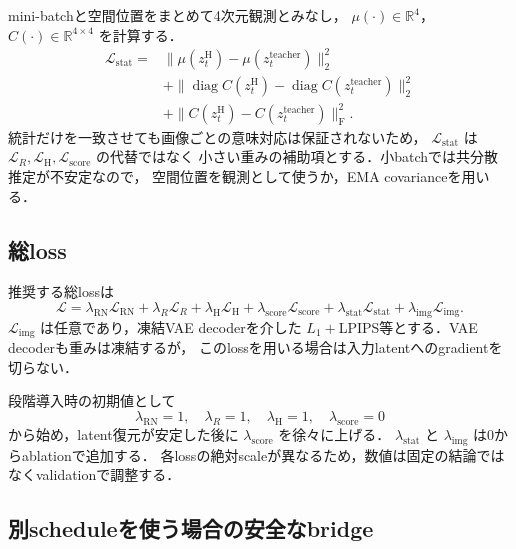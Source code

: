 \documentclass[11pt,a4paper]{ltjsarticle}
\newcommand{\R}{\mathbb{R}}
\begin{document}
mini-batchと空間位置をまとめて4次元観測とみなし，
\(\mu(\cdot)\in\R^4\)，\(C(\cdot)\in\R^{4\times4}\) を計算する．
\begin{equation}
\begin{split}
  \mathcal L_{\mathrm{stat}}
  ={}&
  \lVert\mu(z_t^{\mathrm H})-\mu(z_t^{\mathrm{teacher}})\rVert_2^2\\
  &+
  \lVert
    \operatorname{diag}C(z_t^{\mathrm H})
    -
    \operatorname{diag}C(z_t^{\mathrm{teacher}})
  \rVert_2^2\\
  &+
  \lVert
    C(z_t^{\mathrm H})-C(z_t^{\mathrm{teacher}})
  \rVert_{\mathrm F}^2 .
\end{split}
\label{eq:stat-loss}
\end{equation}
統計だけを一致させても画像ごとの意味対応は保証されないため，
\(\mathcal L_{\mathrm{stat}}\) は
\(\mathcal L_R,\mathcal L_{\mathrm H},\mathcal L_{\mathrm{score}}\) の代替ではなく
小さい重みの補助項とする．小batchでは共分散推定が不安定なので，
空間位置を観測として使うか，EMA covarianceを用いる．

\subsection{総loss}

推奨する総lossは
\begin{equation}
  \mathcal L
  =
  \lambda_{\mathrm{RN}}\mathcal L_{\mathrm{RN}}
  +
  \lambda_R\mathcal L_R
  +
  \lambda_{\mathrm H}\mathcal L_{\mathrm H}
  +
  \lambda_{\mathrm{score}}\mathcal L_{\mathrm{score}}
  +
  \lambda_{\mathrm{stat}}\mathcal L_{\mathrm{stat}}
  +
  \lambda_{\mathrm{img}}\mathcal L_{\mathrm{img}} .
\label{eq:total-loss}
\end{equation}
\(\mathcal L_{\mathrm{img}}\) は任意であり，凍結VAE decoderを介した
\(L_1+\)LPIPS等とする．VAE decoderも重みは凍結するが，
このlossを用いる場合は入力latentへのgradientを切らない．

段階導入時の初期値として
\[
  \lambda_{\mathrm{RN}}=1,\quad
  \lambda_R=1,\quad
  \lambda_{\mathrm H}=1,\quad
  \lambda_{\mathrm{score}}=0
\]
から始め，latent復元が安定した後に
\(\lambda_{\mathrm{score}}\) を徐々に上げる．
\(\lambda_{\mathrm{stat}}\) と \(\lambda_{\mathrm{img}}\) は0からablationで追加する．
各lossの絶対scaleが異なるため，数値は固定の結論ではなくvalidationで調整する．

\subsection{別scheduleを使う場合の安全なbridge}
\end{document}
